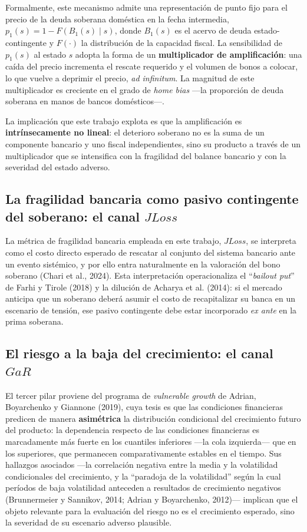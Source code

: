 \documentclass[5p,times,twocolumn,authoryear]{elsarticle}
\begin{document}
Formalmente, este mecanismo admite una representación de punto fijo para el precio de la deuda soberana doméstica en la fecha intermedia, $p_1(s) = 1 - F\!\left(B_1(s)\mid s\right)$, donde $B_1(s)$ es el acervo de deuda estado-contingente y $F(\cdot)$ la distribución de la capacidad fiscal. La sensibilidad de $p_1(s)$ al estado $s$ adopta la forma de un \textbf{multiplicador de amplificación}: una caída del precio incrementa el rescate requerido y el volumen de bonos a colocar, lo que vuelve a deprimir el precio, \textit{ad infinitum}. La magnitud de este multiplicador es creciente en el grado de \textit{home bias} —la proporción de deuda soberana en manos de bancos domésticos—.

La implicación que este trabajo explota es que la amplificación es \textbf{intrínsecamente no lineal}: el deterioro soberano no es la suma de un componente bancario y uno fiscal independientes, sino su producto a través de un multiplicador que se intensifica con la fragilidad del balance bancario y con la severidad del estado adverso.

\subsection{La fragilidad bancaria como pasivo contingente del soberano: el canal $JLoss$}

La métrica de fragilidad bancaria empleada en este trabajo, $JLoss$, se interpreta como el costo directo esperado de rescatar al conjunto del sistema bancario ante un evento sistémico, y por ello entra naturalmente en la valoración del bono soberano (Chari et al., 2024). Esta interpretación operacionaliza el ``\textit{bailout put}'' de Farhi y Tirole (2018) y la dilución de Acharya et al. (2014): si el mercado anticipa que un soberano deberá asumir el costo de recapitalizar su banca en un escenario de tensión, ese pasivo contingente debe estar incorporado \textit{ex ante} en la prima soberana.

\subsection{El riesgo a la baja del crecimiento: el canal $GaR$}

El tercer pilar proviene del programa de \textit{vulnerable growth} de Adrian, Boyarchenko y Giannone (2019), cuya tesis es que las condiciones financieras predicen de manera \textbf{asimétrica} la distribución condicional del crecimiento futuro del producto: la dependencia respecto de las condiciones financieras es marcadamente más fuerte en los cuantiles inferiores —la cola izquierda— que en los superiores, que permanecen comparativamente estables en el tiempo. Sus hallazgos asociados —la correlación negativa entre la media y la volatilidad condicionales del crecimiento, y la ``paradoja de la volatilidad'' según la cual períodos de baja volatilidad anteceden a resultados de crecimiento negativos (Brunnermeier y Sannikov, 2014; Adrian y Boyarchenko, 2012)— implican que el objeto relevante para la evaluación del riesgo no es el crecimiento esperado, sino la severidad de su escenario adverso plausible.
\end{document}
